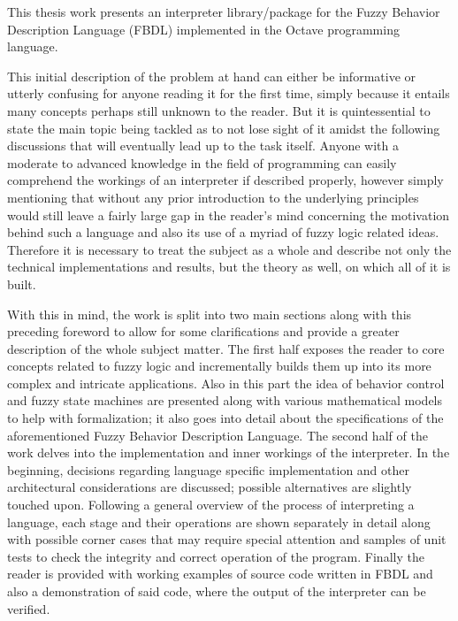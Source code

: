 
This thesis work presents an interpreter library/package for the Fuzzy Behavior Description Language (FBDL) implemented in the Octave programming language.

This initial description of the problem at hand can either be informative or utterly confusing for anyone reading it for the first time, simply because it entails many concepts perhaps still unknown to the reader. But it is quintessential to state the main topic being tackled as to not lose sight of it amidst the following discussions that will eventually lead up to the task itself. Anyone with a moderate to advanced knowledge in the field of programming can easily comprehend the workings of an interpreter if described properly, however simply mentioning that without any prior introduction to the underlying principles would still leave a fairly large gap in the reader's mind concerning the motivation behind such a language and also its use of a myriad of fuzzy logic related ideas. Therefore it is necessary to treat the subject as a whole and describe not only the technical implementations and results, but the theory as well, on which all of it is built.

With this in mind, the work is split into two main sections along with this preceding foreword to allow for some clarifications and provide a greater description of the whole subject matter. The first half exposes the reader to core concepts related to fuzzy logic and incrementally builds them up into its more complex and intricate applications. Also in this part the idea of behavior control and fuzzy state machines are presented along with various mathematical models to help with formalization; it also goes into detail about the specifications of the aforementioned Fuzzy Behavior Description Language. The second half of the work delves into the implementation and inner workings of the interpreter. In the beginning, decisions regarding language specific implementation and other architectural considerations are discussed; possible alternatives are slightly touched upon. Following a general overview of the process of interpreting a language, each stage and their operations are shown separately in detail along with possible corner cases that may require special attention and samples of unit tests to check the integrity and correct operation of the program. Finally the reader is provided with working examples of source code written in FBDL and also a demonstration of said code, where the output of the interpreter can be verified.

